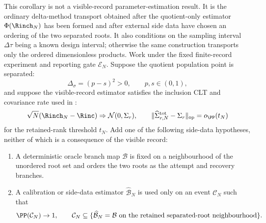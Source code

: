 \begin{corollary}\label{cor:side-data-labelled-rate-wald-main}
This corollary is not a visible-record parameter-estimation result.  It is the
ordinary delta-method transport obtained after the quotient-only estimator
\(\Phi(\Rinch_N)\) has been formed and after external side data have
chosen an ordering of the two separated roots.  It also conditions on the
sampling interval \(\Delta\tau\) being a known design interval; otherwise the
same construction transports only the ordered dimensionless products.  Work
under the fixed finite-record experiment and reporting gate \(\mathcal E_N\).
Suppose the quotient population point is separated:
\[
\Delta_\sigma=(p-s)^2>0,\qquad p,s\in(0,1),
\]
and suppose the visible-record estimator satisfies the inclusion CLT and
covariance rate used in :
\[
\sqrt N(\Rinch_N-\Rinc)\Rightarrow \mathcal N(0,\Sigma_r),\qquad
\|\widehat\Sigma_{r,N}^{\rm tot}-\Sigma_r\|_{\operatorname{op}}
=o_{\PP}(t_N)
\]
for the retained-rank threshold \(t_N\).  Add one of the following side-data
hypotheses, neither of which is a consequence of the visible record:

\begin{enumerate}[label=\textup{(\roman*)},leftmargin=2.2em,itemsep=0.35em]
\item A deterministic oracle branch map \(\mathcal B\) is fixed on a
neighbourhood of the unordered root set and orders the two roots as the
attempt and recovery branches.
\item A calibration or side-data estimator \(\widehat{\mathcal B}_N\) is used
only on an event \(\mathcal C_N\) such that
\[
\PP(\mathcal C_N)\to1,\qquad
\mathcal C_N\subseteq
\{\widehat{\mathcal B}_N=\mathcal B
\text{ on the retained separated-root neighbourhood}\}.
\]
\end{enumerate}


\end{corollary}
